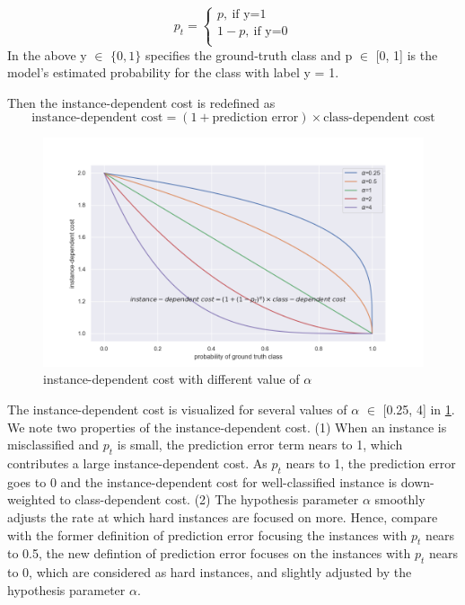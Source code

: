 \documentclass{article}
\begin{document}
 \begin{equation}
 	p_t = 
 	\begin{cases}
 		p, \ \text{if y=1}\\
 		1-p, \ \text{if y=0}\\
 	\end{cases}
 \end{equation}
  In the above y $\in$ $\{ 0, 1\}$ specifies the ground-truth class and p $\in$ [0, 1] is the model's estimated probability for the class with label y = 1.

Then the instance-dependent cost is redefined as 
 \begin{equation}
 	\text{instance-dependent cost}= (1+ \text{prediction error})\times \text{class-dependent cost}
 \end{equation}

\begin{figure}[tbh]
	\centering
	\includegraphics[width=1\linewidth]{"in"}
	\caption{instance-dependent cost with different value of $\alpha$}
	\label{fig:instance-dependent-cost-with-different-value-of-alpha}
\end{figure}

The instance-dependent cost is visualized for several values of $\alpha$ $\in$
[0.25, 4] in \ref{fig:instance-dependent-cost-with-different-value-of-alpha}. We note two properties of the instance-dependent cost.
(1) When an instance is misclassified and $p_t$ is small, the
prediction error term nears to 1, which contributes a large instance-dependent cost. As
$p_t$ nears to 1, the prediction error goes to 0 and the instance-dependent cost for well-classified instance is down-weighted to class-dependent cost. (2) The hypothesis parameter $\alpha$ smoothly adjusts the rate at which hard instances are focused on more. Hence, compare with the former definition of prediction error focusing the instances with $p_t$ nears to 0.5, the new defintion of prediction error focuses on the instances with $p_t$ nears to 0, which are considered as hard instances, and slightly adjusted by the hypothesis parameter $\alpha$.
\end{document}

